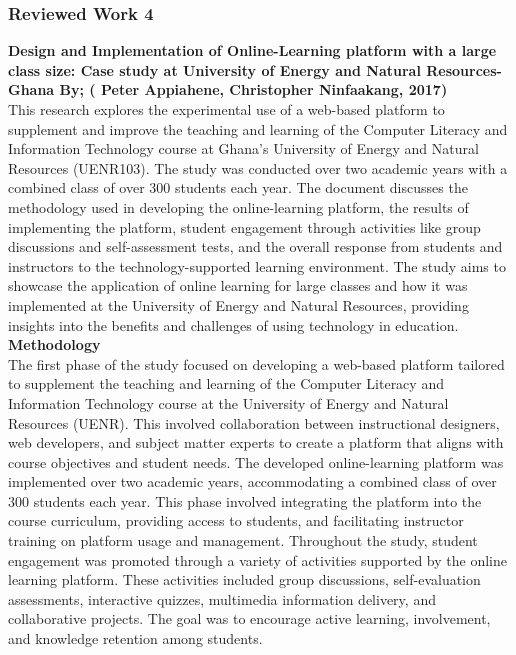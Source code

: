\documentclass[a4paper,12pt]{article}  %
\begin{document}
\subsubsection{ Reviewed Work 4}
\large\textbf{Design and Implementation of Online-Learning platform with a large class size:
  Case study at University of Energy and Natural Resources-Ghana By; ( Peter
  Appiahene, Christopher Ninfaakang, 2017)}\\

This research explores the experimental use of a web-based platform to
supplement and improve the teaching and learning of the Computer Literacy and
Information Technology course at Ghana's University of Energy and Natural
Resources (UENR103). The study was conducted over two academic years with a
combined class of over 300 students each year. The document discusses the
methodology used in developing the online-learning platform, the results of
implementing the platform, student engagement through activities like group
discussions and self-assessment tests, and the overall response from students
and instructors to the technology-supported learning environment. The study
aims to showcase the application of online learning for large classes and how
it was implemented at the University of Energy and Natural Resources, providing
insights into the benefits and challenges of using technology in education.\cite{appiahene2017design}\\

\textbf{Methodology }\\
The first phase of the study focused on developing a web-based
platform tailored to supplement the teaching and learning of the Computer
Literacy and Information Technology course at the University of Energy and
Natural Resources (UENR). This involved collaboration between instructional
designers, web developers, and subject matter experts to create a platform that
aligns with course objectives and student needs. The developed online-learning
platform was implemented over two academic years, accommodating a combined
class of over 300 students each year. This phase involved integrating the
platform into the course curriculum, providing access to students, and
facilitating instructor training on platform usage and management. Throughout
the study, student engagement was promoted through a variety of activities
supported by the online learning platform. These activities included group
discussions, self-evaluation assessments, interactive quizzes, multimedia
information delivery, and collaborative projects. The goal was to encourage
active learning, involvement, and knowledge retention among students.\\
\end{document}
